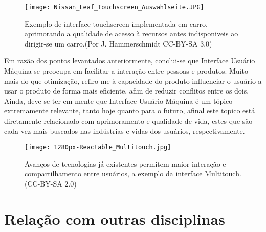 \documentclass[a4paper]{article}
\begin{document}
\begin{figure}[h!]
\centering
\texttt{[image: Nissan\_Leaf\_Touchscreen\_Auswahlseite.JPG]}
\caption{\label{fig:Nissan_Leaf_Touchscreen_Auswahlseite}Exemplo de interface touchscreen implementada em carro, aprimorando a qualidade de acesso à recursos antes indisponiveis ao dirigir-se um carro.(Por J. Hammerschmidt CC-BY-SA 3.0)}
\end{figure}



Em razão dos pontos levantados anteriormente, conclui-se que Interface Usuário Máquina se preocupa em facilitar a interação entre pessoas e produtos. Muito mais do que otimização, refiro-me à capacidade do produto influenciar o usuário a usar o produto de forma mais eficiente, afim de reduzir conflitos entre os dois. Ainda, deve se ter em mente que Interface Usuário Máquina é um tópico extremamente relevante, tanto hoje quanto para o futuro, afinal este topico está diretamente relacionado com aprimoramento e qualidade de vida, estes que são cada vez mais buscados nas indústrias e vidas dos usuários, respectivamente.



\begin{figure}[h!]
\centering
\texttt{[image: 1280px-Reactable\_Multitouch.jpg]}
\caption{\label{fig:1280px-Reactable_Multitouch}Avanços de tecnologias já existentes permitem maior interação e compartilhamento entre usuários, a exemplo da interface Multitouch. (CC-BY-SA 2.0)}
\end{figure}



\section{Relação com outras disciplinas}
\end{document}
